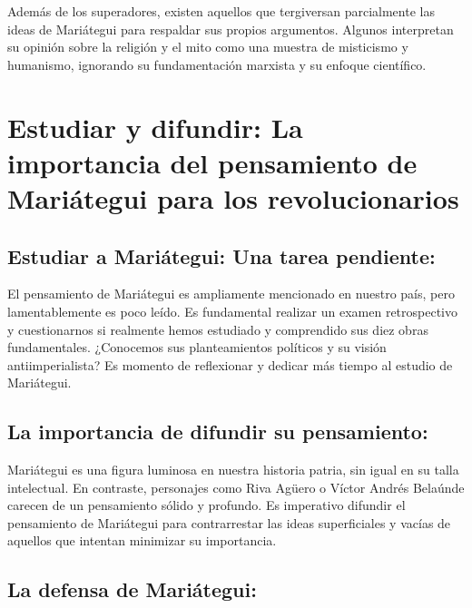 \documentclass[
  letterpaper,
  DIV=11,
  numbers=noendperiod]{scrartcl}
\begin{document}
Además de los superadores, existen aquellos que tergiversan parcialmente
las ideas de Mariátegui para respaldar sus propios argumentos. Algunos
interpretan su opinión sobre la religión y el mito como una muestra de
misticismo y humanismo, ignorando su fundamentación marxista y su
enfoque científico.

\hypertarget{estudiar-y-difundir-la-importancia-del-pensamiento-de-mariuxe1tegui-para-los-revolucionarios}{%
\section{Estudiar y difundir: La importancia del pensamiento de
Mariátegui para los
revolucionarios}\label{estudiar-y-difundir-la-importancia-del-pensamiento-de-mariuxe1tegui-para-los-revolucionarios}}

\hypertarget{estudiar-a-mariuxe1tegui-una-tarea-pendiente}{%
\subsection{Estudiar a Mariátegui: Una tarea
pendiente:}\label{estudiar-a-mariuxe1tegui-una-tarea-pendiente}}

El pensamiento de Mariátegui es ampliamente mencionado en nuestro país,
pero lamentablemente es poco leído. Es fundamental realizar un examen
retrospectivo y cuestionarnos si realmente hemos estudiado y comprendido
sus diez obras fundamentales. ¿Conocemos sus planteamientos políticos y
su visión antiimperialista? Es momento de reflexionar y dedicar más
tiempo al estudio de Mariátegui.

\hypertarget{la-importancia-de-difundir-su-pensamiento}{%
\subsection{La importancia de difundir su
pensamiento:}\label{la-importancia-de-difundir-su-pensamiento}}

Mariátegui es una figura luminosa en nuestra historia patria, sin igual
en su talla intelectual. En contraste, personajes como Riva Agüero o
Víctor Andrés Belaúnde carecen de un pensamiento sólido y profundo. Es
imperativo difundir el pensamiento de Mariátegui para contrarrestar las
ideas superficiales y vacías de aquellos que intentan minimizar su
importancia.

\hypertarget{la-defensa-de-mariuxe1tegui}{%
\subsection{La defensa de
Mariátegui:}\label{la-defensa-de-mariuxe1tegui}}
\end{document}
